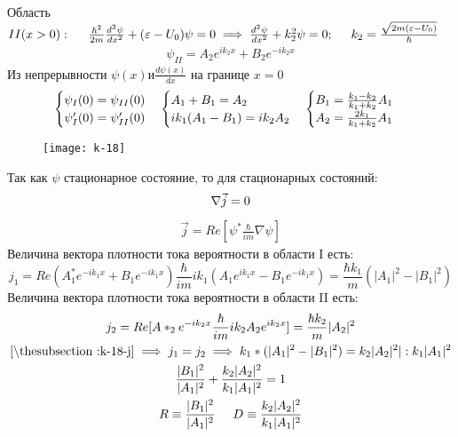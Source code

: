 \documentclass[__main__.tex]{subfiles}
\begin{document}
Область $II(x > 0): \hspace{0.5cm} \frac{\hbar^2}{2m}\frac{d^2\psi}{dx^2} + (\varepsilon - U_0)\psi = 0 \implies \frac{d^2\psi}{dx^2}+k_2^2\psi=0; \hspace{0.5cm} k_2=\frac{\sqrt{2m(\varepsilon - U_0)}}{\hbar}$
\begin{gather*}
\psi_{II} = A_2e^{ik_2x}+B_2e^{-ik_2x}
\end{gather*}
Из непрерывности $\psi(x) и \frac{d\psi(x)}{dx}$ на границе $x=0$ 
\begin{gather}
\begin{cases}
\psi_I(0) = \psi_{II}(0)\\
\psi'_I(0) = \psi'_{II}(0)
\end{cases}
\begin{cases}
A_1 + B_1 = A_2\\
ik_1(A_1 - B_1) = ik_2A_2\\
\end{cases}
\begin{cases}
\llabel{k-18-b1}
B_1 = \frac{k_1 - k_2}{k_1 + k_2}A_1\\
A_2 = \frac{2k_1}{k_1 + k_2}A_1
\end{cases}
\end{gather}
\begin{wrapfigure}{L}{.3\linewidth}
	\texttt{[image: k-18]}
	\caption{}
\end{wrapfigure}
Так как $\psi$ стационарное состояние, то
для стационарных состояний:
\begin{gather}
\nabla\vec{j} = 0
\llabel{k-18-j}
\end{gather}
\begin{gather*}
\vec{j} = Re[\psi^*\frac{\hbar}{im}\nabla\psi]
\end{gather*}
Величина вектора плотности тока вероятности в области I есть:
$$
j_1 = Re(A_1^*e^{-ik_1x} + B_1e^{-ik_1x})\frac{\hbar}{im}ik_1(A_1e^{ik_1x} - B_1e^{-ik_1x}) =\frac{\hbar k_1}{m}(|A_1|^2 - |B_1|^2)
$$
Величина вектора плотности тока вероятности в области II есть:
\begin{gather*}
j_2 = Re[A*_2e^{-ik_2x}\frac{\hbar}{im}ik_2A_2e^{ik_2x}] = \frac{\hbar k_2}{m}|A_2|^2\\
\lref{k-18-j} \implies j_1 = j_2 \implies k_1*(|A_1|^2 - |B_1|^2) = k_2|A_2|^2 | : k_1|A_1|^2\\
\frac{|B_1|^2}{|A_1|^2} + \frac{k_2|A_2|^2}{k_1|A_1|^2} = 1\\
R \equiv \frac{|B_1|^2}{|A_1|^2} \hspace{0.5cm} D \equiv \frac{k_2|A_2|^2}{k_1|A_1|^2}\\
\end{gather*}
\end{document}
